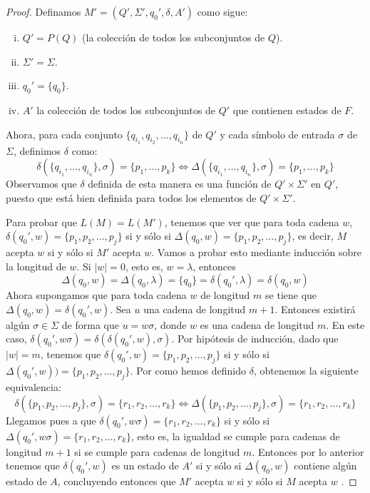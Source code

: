 \begin{proof}
Definamos $M'=(Q',\Sigma',q_0',\delta,A')$ como sigue:
\begin{enumerate}[(i)]
    \item $Q'=P(Q)$ (la colección de todos los subconjuntos de $Q$).
    \item $\Sigma'=\Sigma$.
    \item $q_0'=\{q_0\}$.
    \item $A'$ la colección de todos los subconjuntos de $Q'$ que contienen estados de $F$.
\end{enumerate}
Ahora, para cada conjunto $\{q_{i_1},q_{i_2},\dots,q_{i_n}\}$ de $Q'$ y cada símbolo de entrada $\sigma$ de $\Sigma$,
definimos $\delta$ como:
\begin{equation}
    \delta(\{q_{i_1},\dots,q_{i_n}\},\sigma)=\{p_1,\dots,p_k\} \iff
    \Delta(\{q_{i_1},\dots,q_{i_n}\},\sigma)=\{p_1,\dots,p_k\}
\end{equation}
Observamos que $\delta$ definida de esta manera es una función de $Q'\times\Sigma'$ en $Q'$, puesto que está bien
definida para todos los elementos de $Q'\times\Sigma'$.

Para probar que $L(M)=L(M')$, tenemos que ver que para toda cadena $w$, $\delta(q_0', w)=\{p_1,p_2,\dots,p_j\}$ si y
sólo si $\Delta(q_0, w)=\{p_1,p_2,\dots,p_j\}$, es decir, $M$ acepta $w$ si y sólo si $M'$ acepta $w$. Vamos a probar
esto mediante inducción sobre la longitud de $w$. Si $|w|=0$, esto es, $w=\lambda$, entonces
\begin{equation}
    \Delta(q_0,w)=\Delta(q_0,\lambda)=\{q_0\}=\delta(q_0',\lambda)=\delta(q_0,w)
\end{equation}
Ahora supongamos que para toda cadena $w$ de longitud $m$ se tiene que $\Delta(q_0,w)=\delta(q_0',w)$. Sea $u$ una
cadena de longitud $m+1$. Entonces existirá algún $\sigma\in\Sigma$ de forma que $u=w\sigma$, donde $w$ es una cadena
de longitud $m$. En este caso, $\delta(q_0',w\sigma)=\delta(\delta(q_0',w),\sigma)$. Por hipótesis de inducción, dado
que $|w|=m$, tenemos que $\delta(q_0',w)=\{p_1,p_2,\dots,p_j\}$ si y sólo si 
$\Delta(q_0',w))=\{p_1,p_2,\dots,p_j\}$. Por como hemos definido $\delta$, obtenemos la siguiente equivalencia:
\begin{equation}
    \delta(\{p_1,p_2,\dots,p_j\},\sigma)=\{r_1,r_2,\dots,r_k\} \iff
    \Delta(\{p_1,p_2,\dots,p_j\},\sigma)=\{r_1,r_2,\dots,r_k\}
\end{equation}
Llegamos pues a que $\delta(q_0',w\sigma)=\{r_1,r_2,\dots,r_k\}$ si y sólo si 
$\Delta(q_0',w\sigma)=\{r_1,r_2,\dots,r_k\}$, esto es, la igualdad se cumple para cadenas de longitud $m+1$ si se
cumple para cadenas de longitud $m$. Entonces por lo anterior tenemos que $\delta(q_0',w)$ es un estado de $A'$ si
y sólo si $\Delta(q_0,w)$ contiene algún estado de $A$, concluyendo entonces que $M'$ acepta $w$ si y sólo si $M$
acepta $w$ \cite{kelley_2001}.
\end{proof}

